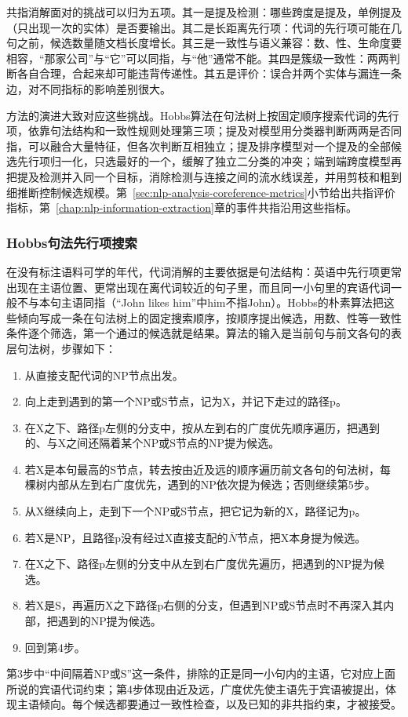共指消解面对的挑战可以归为五项。其一是提及检测：哪些跨度是提及，单例提及（只出现一次的实体）是否要输出。其二是长距离先行项：代词的先行项可能在几句之前，候选数量随文档长度增长。其三是一致性与语义兼容：数、性、生命度要相容，“那家公司”与“它”可以同指，与“他”通常不能。其四是簇级一致性：两两判断各自合理，合起来却可能违背传递性。其五是评价：误合并两个实体与漏连一条边，对不同指标的影响差别很大。

方法的演进大致对应这些挑战。Hobbs算法在句法树上按固定顺序搜索代词的先行项，依靠句法结构和一致性规则处理第三项；提及对模型用分类器判断两两是否同指，可以融合大量特征，但各次判断互相独立；提及排序模型对一个提及的全部候选先行项归一化，只选最好的一个，缓解了独立二分类的冲突；端到端跨度模型再把提及检测并入同一个目标，消除检测与连接之间的流水线误差，并用剪枝和粗到细推断控制候选规模。第~\ref{sec:nlp-analysis-coreference-metrics}小节给出共指评价指标，第~\ref{chap:nlp-information-extraction}章的事件共指沿用这些指标。

\subsubsection{Hobbs句法先行项搜索}
\label{sec:nlp-analysis-hobbs}

在没有标注语料可学的年代，代词消解的主要依据是句法结构：英语中先行项更常出现在主语位置、更常出现在离代词较近的句子里，而且同一小句里的宾语代词一般不与本句主语同指（“John likes him”中him不指John）。Hobbs的朴素算法把这些倾向写成一条在句法树上的固定搜索顺序，按顺序提出候选，用数、性等一致性条件逐个筛选，第一个通过的候选就是结果。算法的输入是当前句与前文各句的表层句法树，步骤如下：
\begin{enumerate}
  \item 从直接支配代词的NP节点出发。
  \item 向上走到遇到的第一个NP或S节点，记为X，并记下走过的路径p。
  \item 在X之下、路径p左侧的分支中，按从左到右的广度优先顺序遍历，把遇到的、与X之间还隔着某个NP或S节点的NP提为候选。
  \item 若X是本句最高的S节点，转去按由近及远的顺序遍历前文各句的句法树，每棵树内部从左到右广度优先，遇到的NP依次提为候选；否则继续第5步。
  \item 从X继续向上，走到下一个NP或S节点，把它记为新的X，路径记为p。
  \item 若X是NP，且路径p没有经过X直接支配的$\bar N$节点，把X本身提为候选。
  \item 在X之下、路径p左侧的分支中从左到右广度优先遍历，把遇到的NP提为候选。
  \item 若X是S，再遍历X之下路径p右侧的分支，但遇到NP或S节点时不再深入其内部，把遇到的NP提为候选。
  \item 回到第4步。
\end{enumerate}
第3步中“中间隔着NP或S”这一条件，排除的正是同一小句内的主语，它对应上面所说的宾语代词约束；第4步体现由近及远，广度优先使主语先于宾语被提出，体现主语倾向。每个候选都要通过一致性检查，以及已知的非共指约束，才被接受。

